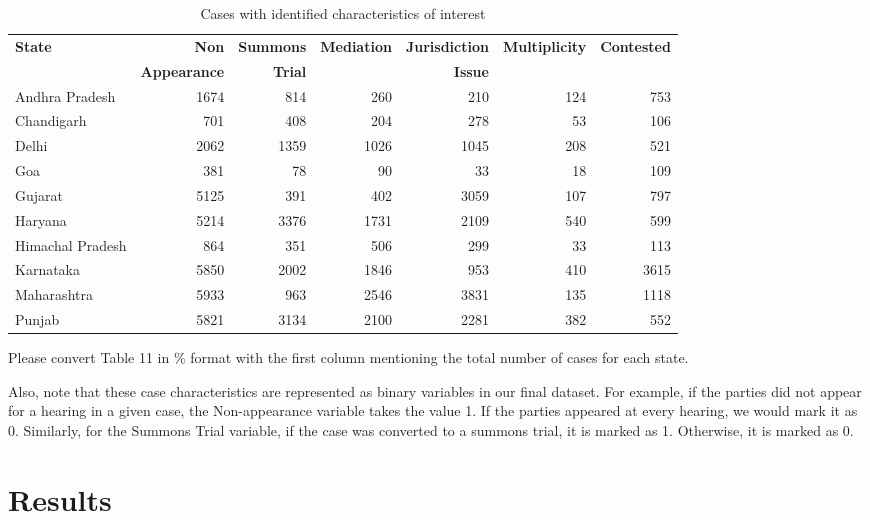 \documentclass[12pt,a4paper]{article}
\begin{document}
	\begin{table}[!ht]
		\caption{Cases with identified characteristics of interest}
		\label{tab:case_chars}
		\centering
		\footnotesize
		\begin{tabular}{@{}lrrrrrr@{}}
			\toprule
			\textbf{State} & \textbf{Non} & \textbf{Summons} & \textbf{Mediation} & \textbf{Jurisdiction} & \textbf{Multiplicity} & \textbf{Contested} \\
			& \textbf{Appearance} & \textbf{Trial} & & \textbf{Issue} & &\\
			\midrule
			Andhra Pradesh & 1674 & 814 & 260 & 210 & 124 & 753 \\
			Chandigarh & 701 & 408 & 204 & 278 & 53 & 106 \\
			Delhi & 2062 & 1359 & 1026 & 1045 & 208 & 521 \\
			Goa & 381 & 78 & 90 & 33 & 18 & 109 \\
			Gujarat & 5125 & 391 & 402 & 3059 & 107 & 797 \\
			Haryana & 5214 & 3376 & 1731 & 2109 & 540 & 599 \\
			Himachal Pradesh & 864 & 351 & 506 & 299 & 33 & 113 \\
			Karnataka & 5850 & 2002 & 1846 & 953 & 410 & 3615 \\
			Maharashtra & 5933 & 963 & 2546 & 3831 & 135 & 1118 \\
			Punjab & 5821 & 3134 & 2100 & 2281 & 382 & 552 \\
			\bottomrule
		\end{tabular}
	\end{table}
	
	{\color{red} Please convert Table 11 in \% format with the first column mentioning the total number of cases for each state.}
	
	Also, note that these case characteristics are represented as binary variables in our final dataset. For example, if the parties did not appear for a hearing in a given case, the Non-appearance variable takes the value 1. If the parties appeared at every hearing, we would mark it as 0. Similarly, for the Summons Trial variable, if the case was converted to a summons trial, it is marked as 1. Otherwise, it is marked as 0.
	
	
	\section{Results}
	\label{sec:results}
	
\end{document}
